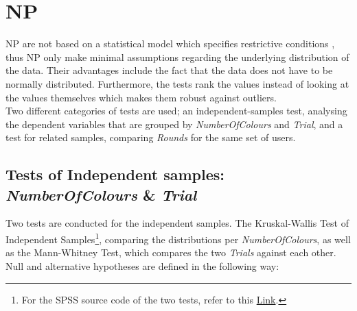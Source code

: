 %
%
\section{\acf{NP}}
\label{ch:Evaluation:sec:Non-parametrictest}

\ac{NP} are not based on a statistical model which specifies restrictive conditions \citep{Siegel1957}, thus \ac{NP} only make minimal assumptions regarding the underlying distribution of the data. Their advantages include the fact that the data does not have to be normally distributed. Furthermore, the tests rank the values instead of looking at the values themselves which makes them robust against outliers.\\
Two different categories of tests are used; an independent-samples test, analysing the dependent variables that are grouped by \textit{NumberOfColours} and \textit{Trial}, and a test for related samples, comparing \textit{Rounds} for the same set of users. 

\subsection{Tests of Independent samples: \textit{NumberOfColours} \& \textit{Trial}}
Two tests are conducted for the independent samples. The Kruskal-Wallis Test of Independent Samples\footnote{For the SPSS source code of the two tests, refer to this \href{http://publib.boulder.ibm.com/infocenter/spssstat/v20r0m0/topic/com.ibm.spss.statistics.help/alg_nonparametric_independent_wald-wolfowitz.htm}{Link}.}, comparing the distributions per \textit{NumberOfColours}, as well as the Mann-Whitney Test, which compares the two \textit{Trials} against each other.\\
Null and alternative hypotheses are defined in the following way: 

